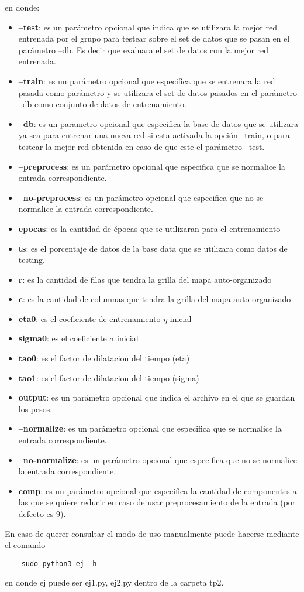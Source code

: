 en donde:
\begin{itemize}
  \item \textbf{--test}: es un parámetro opcional que indica que se utilizara la mejor red entrenada por el grupo para testear sobre el set de datos que se pasan en el parámetro
  --db. Es decir que evaluara el set de datos con la mejor red entrenada.
  \item \textbf{--train}: es un parámetro opcional que especifica que se entrenara la red pasada como parámetro y se utilizara el set de datos pasados en el parámetro --db
  como conjunto de datos de entrenamiento.
  \item \textbf{--db}: es un parametro opcional que especifica la base de datos que se utilizara ya sea para entrenar una nueva red si esta activada la opción --train, o
  para testear la mejor red obtenida en caso de que este el parámetro --test.
  \item \textbf{--preprocess}: es un parámetro opcional que especifica que se normalice la entrada correspondiente.
  \item \textbf{--no-preprocess}: es un parámetro opcional que especifica que no se normalice la entrada correspondiente.
  \item \textbf{epocas}: es la cantidad de épocas que se utilizaran para el entrenamiento
  \item \textbf{ts}: es el porcentaje de datos de la base data que se utilizara como datos de testing.
  \item \textbf{r}: es la cantidad de filas que tendra la grilla del mapa auto-organizado
  \item \textbf{c}: es la cantidad de columnas que tendra la grilla del mapa auto-organizado
  \item \textbf{eta0}: es el coeficiente de entrenamiento $\eta$ inicial
  \item \textbf{sigma0}: es el coeficiente $\sigma$ inicial
  \item \textbf{tao0}: es el factor de dilatacion del tiempo (eta)
  \item \textbf{tao1}: es el factor de dilatacion del tiempo (sigma)
  \item \textbf{output}: es un parámetro opcional que indica el archivo en el que se guardan los pesos.
  \item \textbf{--normalize}: es un parámetro opcional que especifica que se normalice la entrada correspondiente.
  \item \textbf{--no-normalize}: es un parámetro opcional que especifica que no se normalice la entrada correspondiente.
  \item \textbf{comp}: es un parámetro opcional que especifica la cantidad de componentes a las que se quiere reducir en caso     de usar preprocesamiento de la entrada (por defecto es 9).

\end{itemize}

En caso de querer consultar el modo de uso manualmente puede hacerse mediante el comando
\begin{verbatim}
    sudo python3 ej -h
\end{verbatim}
en donde ej puede ser {ej1.py, ej2.py} dentro de la carpeta tp2.

\newpage
